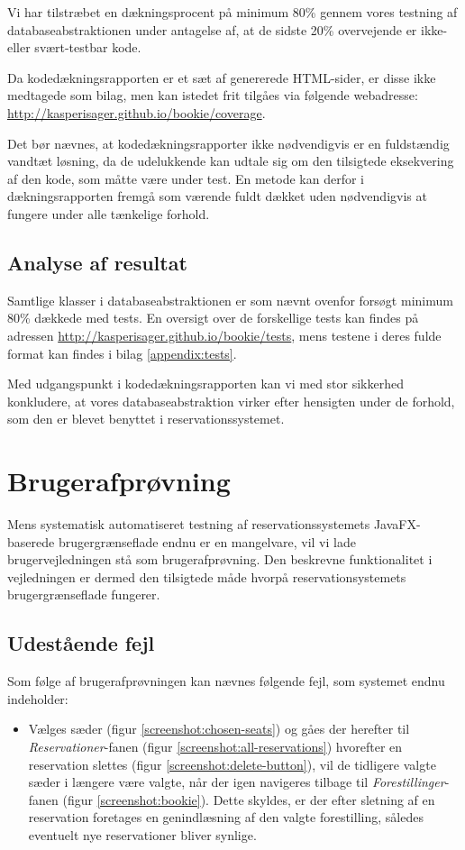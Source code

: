 Vi har tilstræbet en dækningsprocent på minimum 80\% gennem vores testning af databaseabstraktionen under antagelse af, at de sidste 20\% overvejende er ikke- eller svært-testbar kode.

Da kodedækningsrapporten er et sæt af genererede HTML-sider, er disse ikke medtagede som bilag, men kan istedet frit tilgåes via følgende webadresse: \url{http://kasperisager.github.io/bookie/coverage}.

Det bør nævnes, at kodedækningsrapporter ikke nødvendigvis er en fuldstændig vandtæt løsning, da de udelukkende kan udtale sig om den tilsigtede eksekvering af den kode, som måtte være under test. En metode kan derfor i dækningsrapporten fremgå som værende fuldt dækket uden nødvendigvis at fungere under alle tænkelige forhold.

\subsection{Analyse af resultat}

Samtlige klasser i databaseabstraktionen er som nævnt ovenfor forsøgt minimum 80\% dækkede med tests. En oversigt over de forskellige tests kan findes på adressen \url{http://kasperisager.github.io/bookie/tests}, mens testene i deres fulde format kan findes i bilag \ref{appendix:tests}.

Med udgangspunkt i kodedækningsrapporten kan vi med stor sikkerhed konkludere, at vores databaseabstraktion virker efter hensigten under de forhold, som den er blevet benyttet i reservationssystemet.

\section{Brugerafprøvning}

Mens systematisk automatiseret testning af reservationssystemets JavaFX-baserede brugergrænseflade endnu er en mangelvare, vil vi lade brugervejledningen stå som brugerafprøvning. Den beskrevne funktionalitet i vejledningen er dermed den tilsigtede måde hvorpå reservationsystemets brugergrænseflade fungerer.

\subsection{Udestående fejl}

Som følge af brugerafprøvningen kan nævnes følgende fejl, som systemet endnu indeholder:

\begin{itemize}
  \item Vælges sæder (figur \ref{screenshot:chosen-seats}) og gåes der herefter til \textit{Reservationer}-fanen (figur \ref{screenshot:all-reservations}) hvorefter en reservation slettes (figur \ref{screenshot:delete-button}), vil de tidligere valgte sæder i længere være valgte, når der igen navigeres tilbage til \textit{Forestillinger}-fanen (figur \ref{screenshot:bookie}). Dette skyldes, er der efter sletning af en reservation foretages en genindlæsning af den valgte forestilling, således eventuelt nye reservationer bliver synlige.
\end{itemize}
